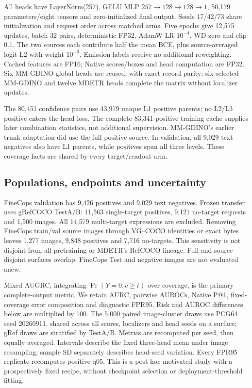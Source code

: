 \documentclass[10pt,twocolumn,letterpaper]{article}
\begin{document}
All heads have LayerNorm(257), GELU MLP
$257\!\rightarrow\!128\!\rightarrow\!128\!\rightarrow\!1$,
50,179 parameters/eight tensors and zero-initialized final output.
Seeds 17/42/73 share initialization and request order across matched arms.
Five epochs give 12,575 updates, batch 32 pairs, deterministic FP32,
AdamW LR $10^{-4}$, WD zero and clip 0.1. The two sources each contribute
half the mean BCE, plus source-averaged logit L2 with weight $10^{-3}$.
Emission labels receive no additional reweighting. Cached features are
FP16; Native scores/boxes and head computation are FP32. Six MM-GDINO
global heads are reused, with exact record parity; six selected MM-GDINO
and twelve MDETR heads complete the matrix without localizer updates.

The 80,451 confidence pairs use 43,979 unique L1 positive parents;
no L2/L3 positive enters the head loss. The complete 83,341-positive
training cache supplies later combination statistics, not additional
supervision. MM-GDINO's earlier trunk adaptation did use the full positive
source. In validation, all 9,029 text negatives also have L1 parents,
while positives span all three levels. These coverage facts are shared
by every target/readout arm.

\subsection{Populations, endpoints and uncertainty}
FineCops validation has 9,426 positives and 9,029 text negatives.
Frozen transfer uses gRefCOCO TestA/B: 11,563 single-target positives,
9,121 no-target requests and 1,500 images. All 14,579 multi-target
expressions are excluded. Removing FineCops train/val source images
through VG--COCO identities or exact bytes leaves 1,277 images,
9,848 positives and 7,716 no-targets. This sensitivity is not disjoint
from all pretraining or MDETR's RefCOCO lineage. Full and source-disjoint
surfaces overlap. FineCops Test and negative images are not evaluated anew.

Mixed AUGRC, integrating $\Pr(Y=0,c\geq t)$ over coverage, is the primary
complete-output metric. We retain AURC, pairwise AUROCs, Native P@1,
fixed-coverage error composition and diagnostic FPR95. Risk and AUROC
differences below are multiplied by 100. The 5,000 paired image-cluster
draws use PCG64 seed 20260911, shared across all scores, localizers and
head seeds on a surface; gRef draws are stratified by TestA/B. Metrics
are recomputed per seed, then equally averaged. Intervals describe the
fixed three-head mean under image resampling; sample SD separately
describes head-seed variation. Every FPR95 replicate recomputes positive
q05. This is a post-hoc-motivated study with a prospectively fixed recipe,
without checkpoint selection or deployment-threshold fitting.
\end{document}
